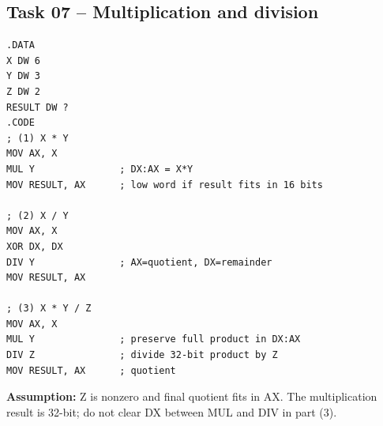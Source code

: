 \documentclass[10pt,a4paper]{article}
\begin{document}
\subsection*{Task 07 -- Multiplication and division}
\begin{lstlisting}[style=asm]
.DATA
X DW 6
Y DW 3
Z DW 2
RESULT DW ?
.CODE
; (1) X * Y
MOV AX, X
MUL Y               ; DX:AX = X*Y
MOV RESULT, AX      ; low word if result fits in 16 bits

; (2) X / Y
MOV AX, X
XOR DX, DX
DIV Y               ; AX=quotient, DX=remainder
MOV RESULT, AX

; (3) X * Y / Z
MOV AX, X
MUL Y               ; preserve full product in DX:AX
DIV Z               ; divide 32-bit product by Z
MOV RESULT, AX      ; quotient
\end{lstlisting}
\textbf{Assumption:} Z is nonzero and final quotient fits in AX. The multiplication result is 32-bit; do not clear DX between MUL and DIV in part (3).
\end{document}
